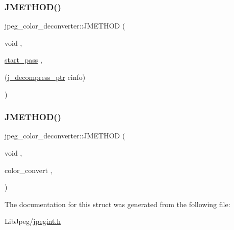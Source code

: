 \subsubsection{\texorpdfstring{JMETHOD()}{JMETHOD()}\hspace{0.1cm}{\footnotesize\ttfamily [1/2]}}
{\footnotesize\ttfamily jpeg\+\_\+color\+\_\+deconverter\+::\+J\+M\+E\+T\+H\+OD (\begin{DoxyParamCaption}\item[{void}]{,  }\item[{\mbox{\hyperlink{jddctmgr_8c_a1964f006adb8fb80f57e455f6452aec1}{start\+\_\+pass}}}]{,  }\item[{(\mbox{\hyperlink{jpeglib_8h_a00c7d78af44bd26a901c791ccfc1e178}{j\+\_\+decompress\+\_\+ptr}} cinfo)}]{ }\end{DoxyParamCaption})}

\mbox{\label{structjpeg__color__deconverter_ab0fedad382d6b40b3698181271bb4ba4}} 
\subsubsection{\texorpdfstring{JMETHOD()}{JMETHOD()}\hspace{0.1cm}{\footnotesize\ttfamily [2/2]}}
{\footnotesize\ttfamily jpeg\+\_\+color\+\_\+deconverter\+::\+J\+M\+E\+T\+H\+OD (\begin{DoxyParamCaption}\item[{void}]{,  }\item[{color\+\_\+convert}]{,  }\item[{(\mbox{\hyperlink{jpeglib_8h_a00c7d78af44bd26a901c791ccfc1e178}{j\+\_\+decompress\+\_\+ptr}} cinfo, \mbox{\hyperlink{jpeglib_8h_a4bf858e4d42202287e786bdec2f3b62b}{J\+S\+A\+M\+P\+I\+M\+A\+GE}} input\+\_\+buf, \mbox{\hyperlink{jmorecfg_8h_a04ed4674f6f1d0d50ec241531e38274f}{J\+D\+I\+M\+E\+N\+S\+I\+ON}} input\+\_\+row, \mbox{\hyperlink{jpeglib_8h_ac9d5d1b829ed51769db69a37271a7e91}{J\+S\+A\+M\+P\+A\+R\+R\+AY}} \mbox{\hyperlink{jdct_8h_ad7e4660a191b1a791748dd44d5a7a0ec}{output\+\_\+buf}}, int \mbox{\hyperlink{jpegint_8h_ac5f8b57092da0f421713ba171c4c9f87}{num\+\_\+rows}})}]{ }\end{DoxyParamCaption})}



The documentation for this struct was generated from the following file\+:\begin{DoxyCompactItemize}
\item 
Lib\+Jpeg/\mbox{\hyperlink{jpegint_8h}{jpegint.\+h}}\end{DoxyCompactItemize}
